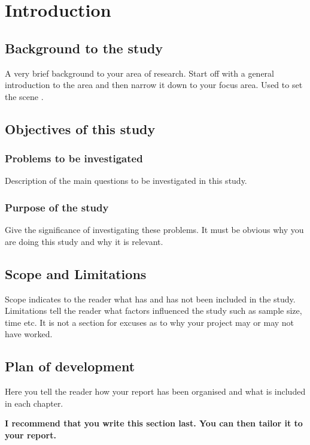 \chapter{Introduction}

\section{Background to the study}
A very brief background to your area of research. Start off with a general introduction to the area and
then narrow it down to your focus area. Used to set the scene .
\section{Objectives of this study}
\subsection{Problems to be investigated}
Description of the main questions to be investigated in this study.
\subsection{Purpose of the study}
Give the significance of investigating these problems. It must be obvious why you are doing this study
and why it is relevant.

\section{Scope and Limitations}
Scope indicates to the reader what has and has not been included in the study. Limitations tell the
reader what factors influenced the study such as sample size, time etc. It is not a section for excuses as
to why your project may or may not have worked.

\section{Plan of development}
Here you tell the reader how your report has been organised and what is included in each
chapter.

{\bf I recommend that you write this section last. You can then tailor it to your report.}
